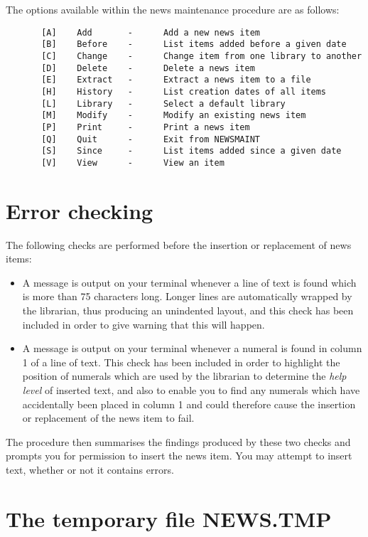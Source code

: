 The options available within the news maintenance procedure are as follows:
\begin{verbatim}
       [A]    Add       -      Add a new news item
       [B]    Before    -      List items added before a given date
       [C]    Change    -      Change item from one library to another
       [D]    Delete    -      Delete a news item
       [E]    Extract   -      Extract a news item to a file
       [H]    History   -      List creation dates of all items
       [L]    Library   -      Select a default library
       [M]    Modify    -      Modify an existing news item
       [P]    Print     -      Print a news item
       [Q]    Quit      -      Exit from NEWSMAINT
       [S]    Since     -      List items added since a given date
       [V]    View      -      View an item
\end{verbatim}

\section {Error checking}

The following checks are performed before the insertion or replacement of news
items:
\begin{itemize}
\item A message is output on your terminal whenever a line of text is found
which is more than 75 characters long.
Longer lines are automatically wrapped by the librarian, thus producing an
unindented layout, and this check has been included in order to give warning
that this will happen. 
\item A message is output on your terminal whenever a numeral is found in
column 1 of a line of text.
This check has been included in order to highlight the position of numerals
which are used by the librarian to determine the {\em help level} of inserted
text, and also to enable you to find any numerals which have accidentally been
placed in column 1 and could therefore cause the insertion or replacement of
the news item to fail.
\end{itemize}
The procedure then summarises the findings produced by these two checks and
prompts you for permission to insert the news item.
You may attempt to insert text, whether or not it contains errors.

\section{The temporary file NEWS.TMP}

